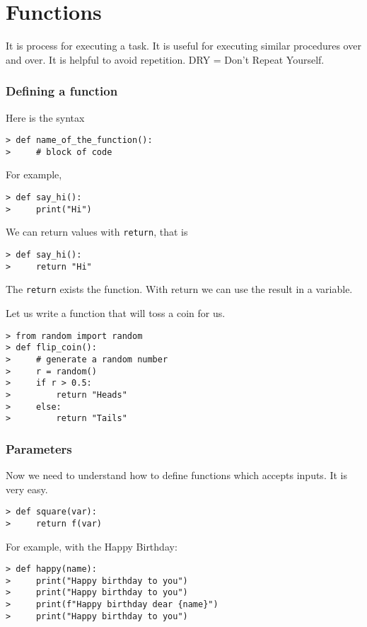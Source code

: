 
\section{Functions}

It is process for executing a task. It is useful for executing similar procedures over and over. It is helpful to avoid repetition. DRY = Don't Repeat Yourself. 

\subsubsection{Defining a function}

Here is the syntax 
\begin{verbatim}
> def name_of_the_function():
>     # block of code
\end{verbatim}
For example, 
\begin{verbatim}
> def say_hi():
>     print("Hi")
\end{verbatim}

We can return values with \verb|return|, that is
\begin{verbatim}
> def say_hi():
>     return "Hi"
\end{verbatim}
The \verb|return| exists the function. With return we can use the result in a variable. 

Let us write a function that will toss a coin for us. 
\begin{verbatim}
> from random import random
> def flip_coin():
>     # generate a random number
>     r = random()
>     if r > 0.5:
>         return "Heads"
>     else:
>         return "Tails"	
\end{verbatim}

\subsubsection{Parameters}

Now we need to understand how to define functions which accepts inputs. It is very easy. 
\begin{verbatim}
> def square(var):
>     return f(var)
\end{verbatim}

For example, with the Happy Birthday:
\begin{verbatim}
> def happy(name):
>     print("Happy birthday to you")
>     print("Happy birthday to you")
>     print(f"Happy birthday dear {name}")
>     print("Happy birthday to you")
\end{verbatim}


